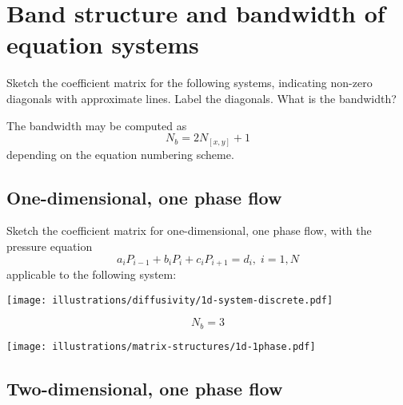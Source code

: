 
\section{Band structure and bandwidth of equation systems} %
\label{sec:band_structure_and_bandwidth_of_equation_systems}

\begin{question}
  Sketch the coefficient matrix for the following systems, indicating non-zero diagonals with
approximate lines. Label the diagonals. What is the bandwidth?
\end{question}

The bandwidth may be computed as
\begin{equation}
  N_b = 2N_{[x,y]}+1
\end{equation}
depending on the equation numbering scheme.

\subsection{One-dimensional, one phase flow} %
\label{sub:one_dimensional_}

\begin{question}
  Sketch the coefficient matrix for one-dimensional, one phase flow, with the pressure equation
  \begin{equation}
    \nonumber
    a_i P_{i-1} + b_i P_i + c_i P_{i+1} = d_i, \; i=1,N
  \end{equation}
  applicable to the following system:

  \begin{center}
    \texttt{[image: illustrations/diffusivity/1d-system-discrete.pdf]}
  \end{center}
\end{question}

\begin{equation}
  N_b = 3 \nonumber
\end{equation}

\begin{center}
  \texttt{[image: illustrations/matrix-structures/1d-1phase.pdf]}
\end{center}


\subsection{Two-dimensional, one phase flow} %
\label{sub:two_dimensional_one_phase_flow}

